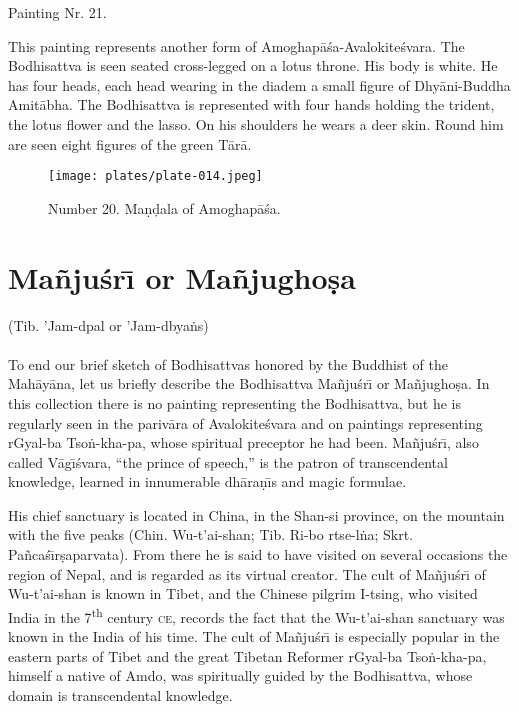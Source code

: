 \documentclass[a4paper, 12pt, oneside]{article}
\begin{document}
Painting Nr. 21.

\bigskip

This painting represents another form of Amoghap\={a}\'{s}a-Avalokite\'{s}vara. The Bodhisattva is seen seated cross-legged on a lotus throne. His body is white. He has four heads, each head wearing in the diadem a small figure of Dhy\={a}ni-Buddha Amit\={a}bha. The Bodhisattva is represented with four hands holding the trident, the lotus flower and the lasso. On his shoulders he wears a deer skin. Round him are seen eight figures of the green T\={a}r\={a}.

\clearpage
\begin{figure}[H]
\centering
\texttt{[image: plates/plate-014.jpeg]}
\caption*{Number 20. Ma\d{n}\d{d}ala of Amoghap\={a}\'{s}a.}
\end{figure}
\clearpage
\section{Ma\~{n}ju\'{s}r\={\i} or Ma\~{n}jugho\d{s}a}
\begin{center}
(Tib. 'Jam-dpal or 'Jam-dbya\.{n}s)
\end{center}
\paragraph{}
To end our brief sketch of Bodhisattvas honored by the Buddhist of the Mah\={a}y\={a}na, let us briefly describe the Bodhisattva Ma\~{n}ju\'{s}r\={\i} or Ma\~{n}jugho\d{s}a. In this collection there is no painting representing the Bodhisattva, but he is regularly seen in the pariv\={a}ra of Avalokite\'{s}vara and on paintings representing rGyal-ba Tso\.{n}-kha-pa, whose spiritual preceptor he had been. Ma\~{n}ju\'{s}r\={\i}, also called V\={a}g\={\i}\'{s}vara, ``the prince of speech,'' is the patron of transcendental knowledge, learned in innumerable dh\={a}ra\d{n}\={\i}s and magic formulae.

His chief sanctuary is located in China, in the Shan-si province, on the mountain with the five peaks (Chin. Wu-t'ai-shan; Tib. Ri-bo rtse-l\.{n}a; Skrt. Pa\~{n}ca\'{s}\={\i}r\d{s}aparvata). From there he is said to have visited on several occasions the region of Nepal, and is regarded as its virtual creator. The cult of Ma\~{n}ju\'{s}r\={\i} of Wu-t'ai-shan is known in Tibet, and the Chinese pilgrim I-tsing, who visited India in the 7\textsuperscript{th} century \textsc{ce}, records the fact that the Wu-t'ai-shan sanctuary was known in the India of his time. The cult of Ma\~{n}ju\'{s}r\={\i} is especially popular in the eastern parts of Tibet and the great Tibetan Reformer rGyal-ba Tso\.{n}-kha-pa, himself a native of Amdo, was spiritually guided by the Bodhisattva, whose domain is transcendental knowledge.
\end{document}

